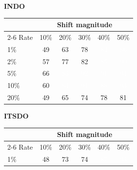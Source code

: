 \documentclass[12pt]{article}
\begin{document}
\begin{table}[H]
\centering\footnotesize
\setlength{\tabcolsep}{5pt}
\renewcommand{\arraystretch}{1.15}
\begin{minipage}[t]{0.49\textwidth}\centering
\textbf{INDO}\par\vspace{3pt}
\begin{tabular}{@{}l ccccc@{}}
\toprule
& \multicolumn{5}{c}{Shift magnitude}\\
\cmidrule(l){2-6}
Rate & 10\% & 20\% & 30\% & 40\% & 50\% \\
\midrule
1\% & \cellcolor[RGB]{254,251,185}49 & \cellcolor[RGB]{201,232,128}63 & \cellcolor[RGB]{117,195,100}78 & \cellcolor[RGB]{69,173,90}\textcolor{white}{84} & \cellcolor[RGB]{54,165,87}\textcolor{white}{86} \\
2\% & \cellcolor[RGB]{227,243,153}57 & \cellcolor[RGB]{119,196,100}77 & \cellcolor[RGB]{87,181,95}82 & \cellcolor[RGB]{60,168,88}\textcolor{white}{85} & \cellcolor[RGB]{24,149,78}\textcolor{white}{90} \\
5\% & \cellcolor[RGB]{187,226,119}66 & \cellcolor[RGB]{75,175,92}\textcolor{white}{83} & \cellcolor[RGB]{21,143,75}\textcolor{white}{92} & \cellcolor[RGB]{23,147,77}\textcolor{white}{91} & \cellcolor[RGB]{16,134,70}\textcolor{white}{94} \\
10\% & \cellcolor[RGB]{218,239,141}60 & \cellcolor[RGB]{72,174,91}\textcolor{white}{84} & \cellcolor[RGB]{24,149,78}\textcolor{white}{91} & \cellcolor[RGB]{39,158,83}\textcolor{white}{88} & \cellcolor[RGB]{18,137,72}\textcolor{white}{93} \\
20\% & \cellcolor[RGB]{254,250,183}49 & \cellcolor[RGB]{191,227,122}65 & \cellcolor[RGB]{139,205,103}74 & \cellcolor[RGB]{114,194,100}78 & \cellcolor[RGB]{93,184,96}81 \\
\bottomrule
\end{tabular}
\end{minipage}\hfill
\begin{minipage}[t]{0.49\textwidth}\centering
\textbf{ITSDO}\par\vspace{3pt}
\begin{tabular}{@{}l ccccc@{}}
\toprule
& \multicolumn{5}{c}{Shift magnitude}\\
\cmidrule(l){2-6}
Rate & 10\% & 20\% & 30\% & 40\% & 50\% \\
\midrule
1\% & \cellcolor[RGB]{254,250,183}48 & \cellcolor[RGB]{144,207,103}73 & \cellcolor[RGB]{137,204,102}74 & \cellcolor[RGB]{45,161,84}\textcolor{white}{87} & \cellcolor[RGB]{17,136,71}\textcolor{white}{93} \\

\end{tabular}
\end{minipage}
\end{table}
\end{document}
